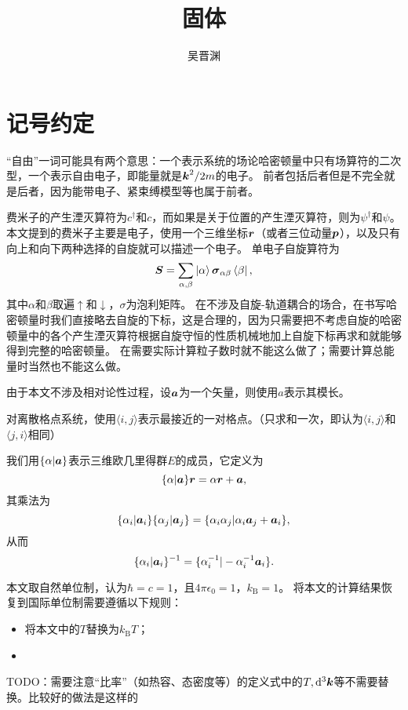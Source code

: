 \documentclass[hyperref, UTF8, a4paper]{ctexart}
\title{固体}
\author{吴晋渊}
\newcommand*{\pair}[1]{\langle #1 \rangle}
\numberwithin{equation}{section}
\begin{document}
\maketitle

\section*{记号约定}

“自由”一词可能具有两个意思：一个表示系统的场论哈密顿量中只有场算符的二次型，一个表示自由电子，即能量就是$\vb*{k}^2/2m$的电子。
前者包括后者但是不完全就是后者，因为能带电子、紧束缚模型等也属于前者。

费米子的产生湮灭算符为${c}^\dagger$和${c}$，而如果是关于位置的产生湮灭算符，则为${\psi}^\dagger$和${\psi}$。
本文提到的费米子主要是电子，使用一个三维坐标$\vb*{r}$（或者三位动量$\vb*{p}$），以及只有向上和向下两种选择的自旋就可以描述一个电子。
单电子自旋算符为
\begin{equation}
    {\vb*{S}} = \sum_{\alpha, \beta} \ket{\alpha} \vb*{\sigma}_{\alpha \beta} \bra{\beta},
\end{equation}
其中$\alpha$和$\beta$取遍$\uparrow$和$\downarrow$，$\sigma$为泡利矩阵。
在不涉及自旋-轨道耦合的场合，在书写哈密顿量时我们直接略去自旋的下标，这是合理的，因为只需要把不考虑自旋的哈密顿量中的各个产生湮灭算符根据自旋守恒的性质机械地加上自旋下标再求和就能够得到完整的哈密顿量。
在需要实际计算粒子数时就不能这么做了；需要计算总能量时当然也不能这么做。

由于本文不涉及相对论性过程，设$\vb*{a}$为一个矢量，则使用$a$表示其模长。

对离散格点系统，使用$\pair{i, j}$表示最接近的一对格点。（只求和一次，即认为$\pair{i, j}$和$\pair{j, i}$相同）

我们用$\{\alpha | \vb*{a} \}$表示三维欧几里得群$E$的成员，它定义为
\begin{equation}
    \{\alpha | \vb*{a} \} \vb*{r} = \alpha \vb*{r} + \vb*{a},
\end{equation}
其乘法为
\begin{equation}
    \{\alpha_i | \vb*{a}_i \} \{\alpha_j | \vb*{a}_j \} = \{ \alpha_i \alpha_j | \alpha_i \vb*{a}_j + \vb*{a}_i \},
\end{equation}
从而
\begin{equation}
    \{\alpha_i | \vb*{a}_i \}^{-1} = \{ \alpha_i^{-1} | - \alpha_i^{-1} \vb*{a}_i \}.
\end{equation}

本文取自然单位制，认为$\hbar=c=1$，且$4\pi\epsilon_0=1$，$k_\text{B}=1$。
将本文的计算结果恢复到国际单位制需要遵循以下规则：
\begin{itemize}
    \item 将本文中的$T$替换为$k_\text{B} T$；
    \item 
\end{itemize}
TODO：需要注意“比率”（如热容、态密度等）的定义式中的$T, \dd[3]{\vb*{k}}$等不需要替换。比较好的做法是这样的
\end{document}
